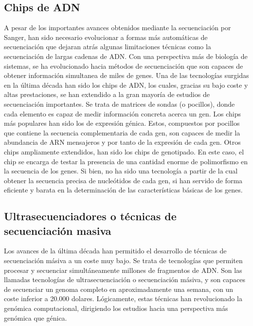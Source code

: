\subsection{Chips de ADN}

A pesar de los importantes avances obtenidos mediante la secuenciación por Sanger, han sido necesario evolucionar a formas más automáticas de secuenciación que dejaran atrás algunas limitaciones técnicas como la secuenciación de largas cadenas de ADN. Con una perspectiva más de biología de sistemas, se ha evolucionado hacia métodos de secuenciación que son capaces de obtener información simultanea de miles de genes. Una de las tecnologías surgidas en la última década han sido los chips de ADN, los cuales, gracias su bajo coste y altas prestaciones, se han extendido a la gran mayoría de estudios de secuenciación importantes. Se trata de matrices de sondas (o pocillos), donde cada elemento es capaz de medir información concreta acerca un gen. Los chips más populares han sido los de expresión génica. Estos, compuestos por pocillos que contiene la secuencia complementaria de cada gen, son capaces de medir la abundancia de ARN mensajeros y por tanto de la expresión de cada gen. Otros chips ampliamente extendidos, han sido los chips de genotipado. En este caso, el chip se encarga de testar la presencia de una cantidad enorme de polimorfismo en la secuencia de los genes. Si bien, no ha sido una tecnología a partir de la cual obtener la secuencia precisa de nucleótidos de cada gen, si han servido de forma eficiente y barata en la determinación de las características básicas de los genes.

\subsection{Ultrasecuenciadores o técnicas de secuenciación masiva}

Los avances de la última década han permitido el desarrollo de técnicas de secuenciación másiva a un coste muy bajo. Se trata de tecnologías que permiten procesar y secuenciar simultáneamente millones de fragmentos de ADN. Son las llamadas tecnologías de ultrasecuenciación o secuenciación másiva, y son capaces de secuenciar un genoma completo en aproximadamente una semana, con un coste inferior a 20.000 dolares. Lógicamente, estas técnicas han revolucionado la genómica computacional, dirigiendo los estudios hacia una perspectiva más genómica que génica.

